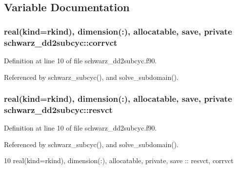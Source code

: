 \subsection{Variable Documentation}
\subsubsection[{corrvct}]{\setlength{\rightskip}{0pt plus 5cm}real(kind=rkind), dimension(\+:), allocatable, save, private schwarz\+\_\+dd2subcyc\+::corrvct\hspace{0.3cm}{\ttfamily [private]}}\label{namespaceschwarz__dd2subcyc_a9a58796fa4747ef6fa92ddeaa1a4aa5b}


Definition at line 10 of file schwarz\+\_\+dd2subcyc.\+f90.



Referenced by schwarz\+\_\+subcyc(), and solve\+\_\+subdomain().

\subsubsection[{resvct}]{\setlength{\rightskip}{0pt plus 5cm}real(kind=rkind), dimension(\+:), allocatable, save, private schwarz\+\_\+dd2subcyc\+::resvct\hspace{0.3cm}{\ttfamily [private]}}\label{namespaceschwarz__dd2subcyc_a12a17ec62996317aeff74f4908b6bf06}


Definition at line 10 of file schwarz\+\_\+dd2subcyc.\+f90.



Referenced by schwarz\+\_\+subcyc(), and solve\+\_\+subdomain().


\begin{DoxyCode}
10     \textcolor{keywordtype}{real(kind=rkind)}, \textcolor{keywordtype}{dimension(:)}, \textcolor{keywordtype}{allocatable}, \textcolor{keywordtype}{private}, \textcolor{keywordtype}{save} :: resvct, 
      corrvct
\end{DoxyCode}
